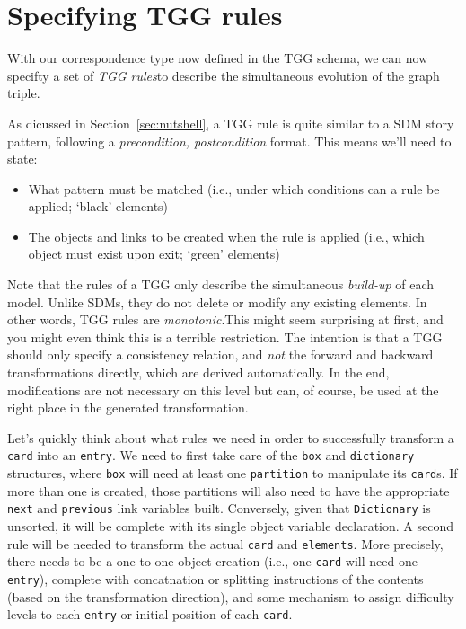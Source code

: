 \newpage
\section{Specifying TGG rules}
\genHeader

With our correspondence type now defined in the TGG schema, we can now specifty a set of \emph{TGG rules}to describe the simultaneous
evolution of the graph triple.

As dicussed in Section~\ref{sec:nutshell}, a TGG rule is quite similar to a SDM story pattern, following a \emph{precondition, postcondition}
format. This means we'll need to state:
\begin{itemize}
  \item What pattern must be matched (i.e., under which conditions can a rule be applied; `black' elements)
  \item The objects and links to be created when the rule is applied (i.e., which object must exist upon exit; `green' elements)
\end{itemize}

\vspace{0.5cm}

Note that the rules of a TGG only describe the simultaneous \emph{build-up} of each model. Unlike SDMs, they do not delete or modify any existing elements.
In other words, TGG rules are \emph{monotonic}.This might seem surprising at first, and you might even think this is a terrible restriction.
The intention is that a TGG should only specify a consistency relation, and \emph{not} the forward and backward transformations directly, which are derived
automatically. In the end, modifications are not necessary on this level but can, of course, be used at the right place in the generated transformation.

Let's quickly think about what rules we need in order to successfully transform a \texttt{card} into an \texttt{entry}. We need to first take care of the
\texttt{box} and \texttt{dictionary} structures, where \texttt{box} will need at least one \texttt{partition} to manipulate its \texttt{card}s. If more than one
is created, those partitions will also need to have the appropriate \texttt{next} and \texttt{previous} link variables built. Conversely, given that
\texttt{Dictionary} is unsorted, it will be complete with its single object variable declaration. A second rule will be needed to transform the actual
\texttt{card} and \texttt{elements}. More precisely, there needs to be a one-to-one object creation (i.e., one \texttt{card} will need one \texttt{entry}),
complete with concatnation or splitting instructions of the contents (based on the transformation direction), and some mechanism to assign difficulty levels to
each \texttt{entry} or initial position of each \texttt{card}.







